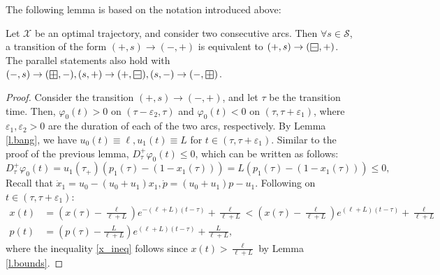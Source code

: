 The following lemma is based on the notation introduced above:
\begin{lemma}
	Let $\mathscr X$ be an optimal trajectory, and consider two consecutive arcs.
	 Then $\forall s \in \mathscr S$, a transition of the form $(+,s) \to (-,+)$ is equivalent to  $(+,s) \to (\sq{-},+)$. 
	The parallel statements also hold with $(-,s) \to (\sq{+},-), (s,+) \to (+,\sq{-}), (s,-)\to(-,\sq{+})$.
\end{lemma}
\begin{proof}
	Consider the transition $(+,s) \to (-,+)$, and let $\tau$ be the transition time. 
	Then,  $\varphi_0(t)>0$ on $(\tau-\varepsilon_2,\tau)$ and $\varphi_0(t)<0$ on  $(\tau,\tau+\varepsilon_1)$, where $\varepsilon_1,\varepsilon_2>0$ are the duration of each of the two arcs, respectively.
	By Lemma \ref{l.bang}, we have $u_0(t)\equiv \ell, u_1(t) \equiv L$ for $t \in (\tau, \tau+\varepsilon_1)$. 
	Similar to the proof of the previous lemma, $D_\tau^+ \varphi_0 (t) \le 0$, which can be written as follows:
	\begin{equation} \label{phi_ineq}
		D_\tau^+ \varphi_0 (t) = u_1(\tau_+) (p_1(\tau)-(1-x_1(\tau)) ) = L( p_1(\tau)- (1-x_1(\tau)) )  \le 0, 
	\end{equation}
	Recall that $\dot x_1 = u_0 - (u_0+u_1)  x_1, \dot p = (u_0+u_1) p - u_1$.
	Following on $t \in (\tau,\tau+\varepsilon_1):$
	\begin{subequations}
		\begin{align} \label{x_ineq}
			x(t) &= \left ( x(\tau) - \frac{\ell}{\ell+L} \right ) e^{-(\ell+L)(t-\tau)} + \frac {\ell}{\ell+L} < \left ( x(\tau) - \frac{\ell}{\ell+L} \right ) e^{(\ell+L)(t-\tau)} + \frac {\ell}{\ell+L}\\
			p(t) &= \left ( p(\tau) - \frac{L}{\ell+L} \right ) e^{(\ell+L)(t-\tau)} + \frac {L}{\ell+L},
		\end{align}
	\end{subequations}
	where the inequality \eqref{x_ineq} follows since $x(t)> \frac{\ell}{\ell+L}$ by Lemma \ref{l.bounds}.
	

\end{proof}
